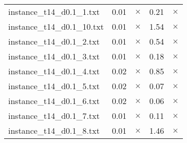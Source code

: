 \documentclass{article}
\begin{document}
\begin{center}
\begin{tabular}{lrrrr}
instance\_t14\_d0.1\_1.txt & 0.01 & 
$\times$
 & 0.21 & 
$\times$
\\
instance\_t14\_d0.1\_10.txt & 0.01 & 
$\times$
 & 1.54 & 
$\times$
\\
instance\_t14\_d0.1\_2.txt & 0.01 & 
$\times$
 & 0.54 & 
$\times$
\\
instance\_t14\_d0.1\_3.txt & 0.01 & 
$\times$
 & 0.18 & 
$\times$
\\
instance\_t14\_d0.1\_4.txt & 0.02 & 
$\times$
 & 0.85 & 
$\times$
\\
instance\_t14\_d0.1\_5.txt & 0.02 & 
$\times$
 & 0.07 & 
$\times$
\\
instance\_t14\_d0.1\_6.txt & 0.02 & 
$\times$
 & 0.06 & 
$\times$
\\
instance\_t14\_d0.1\_7.txt & 0.01 & 
$\times$
 & 0.11 & 
$\times$
\\
instance\_t14\_d0.1\_8.txt & 0.01 & 
$\times$
 & 1.46 & 
$\times$
\\
\hline\end{tabular}
\end{center}
\end{document}
